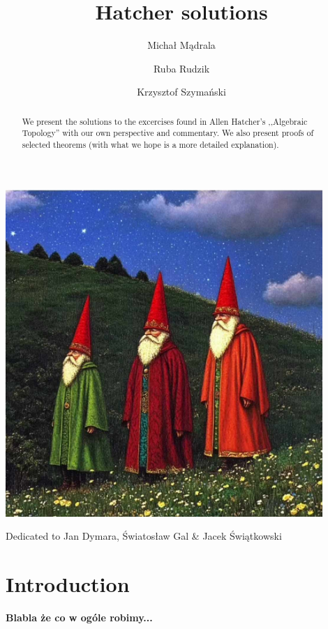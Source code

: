 \documentclass[11pt, a4paper, final]{amsart}
\title{Hatcher solutions}
\author{Michał Mądrala}
\author{Ruba Rudzik}
\author{Krzysztof Szymański}
\newcommand\todo[1]{\textbf{\textcolor{redd}{#1}}}
\numberwithin{theorem}{section}
\theoremstyle{definition}
\theoremstyle{remark}
\begin{document}
	\begin{abstract}
	       We present the solutions to the excercises found in Allen Hatcher's ,,Algebraic Topology'' \cite{AH} with our own perspective and commentary. We also present proofs of selected theorems (with what we hope is a more detailed explanation). 
	\end{abstract}
	
\maketitle

\begin{center}
    \includegraphics[width=120mm]{jd_śwg_jśw.jpg}
\end{center}

\begin{center}
    {\selectfont Dedicated to Jan Dymara, Światosław Gal \& Jacek Świątkowski}
\end{center} 

\newpage

\section{Introduction}

\todo{Blabla że co w ogóle robimy...}
\end{document}
